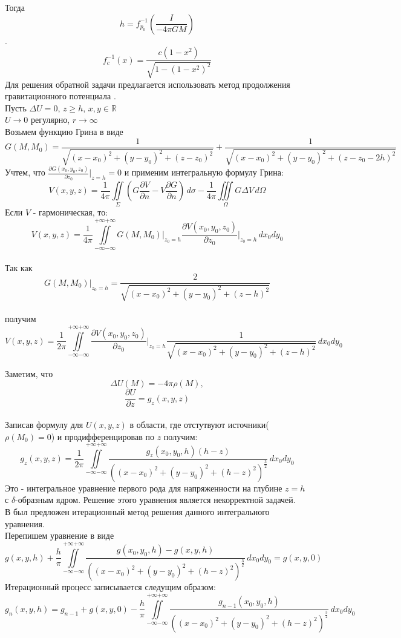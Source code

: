\documentclass[12pt]{article}
\begin{document}
Тогда \[h = f_{p_0}^{-1}\left({\frac{I}{-4{\pi}GM}} \right)\].
\[f_c^{-1}(x)={\frac{c(1-x^2)}{\sqrt{1-(1-x^2)^2}}}\]
\newline
Для решения обратной задачи предлагается использовать метод продолжения гравитационного потенциала \cite{dmitriev2012iterative1786867}.\\
\newline
Пусть ${\Delta}U=0$, $z{\geqslant}h$,
 $x,y {\in} \mathbb{ R}$\\
	$U{\longrightarrow}0$ регулярно, 
$r{\longrightarrow}{\infty}$\\
Возьмем функцию Грина в виде \[G(M,M_0)=\frac{1}{\sqrt{(x-x_0)^2+(y-y_0)^2+(z-z_0)^2}}+\frac{1}{\sqrt{(x-x_0)^2+(y-y_0)^2+(z-z_0-2h)^2}}\]
Учтем, что $\displaystyle\frac{{\partial}G(x_0,y_0,z_0)}{{\partial}z_0}{\Bigr|_{{z}=h}}=0$ и применим интегральную формулу Грина:\\
\[V(x,y,z)=\frac{1}{4\pi}\iint\limits_{\Sigma}\left({G\frac{{\partial}V}{{\partial}n} - V\frac{{\partial}G}{{\partial}n}}\right)\,d{\sigma} - \frac{1}{4\pi}\iiint\limits_{\Omega}G{\Delta}V\,d{\Omega}\]
Если $V$ - гармоническая, то:
\[V(x,y,z)=\frac{1}{4\pi}\iint\limits_{{-\infty}{-\infty}}^{{+\infty}{+\infty}}G(M,M_0){\Bigr|_{{z_0}=h}}\frac{{\partial}V(x_0,y_0,z_0)}{{\partial}z_0}{\Bigr|_{{z_0}=h}}\,dx_0dy_0\]\\

Так как $$G(M,M_0){\Bigr|_{{z_0}=h}}=\frac{2}{\sqrt{(x-x_0)^2+(y-y_0)^2+(z-h)^2}}$$ \\

получим \\
\[V(x,y,z)=\frac{1}{2\pi}\iint\limits_{{-\infty}{-\infty}}^{{+\infty}{+\infty}}\frac{{\partial}V(x_0,y_0,z_0)}{{\partial}z_0}{\Bigr|_{{z_0}=h}\frac{1}{\sqrt{(x-x_0)^2+(y-y_0)^2+(z-h)^2}}}\,dx_0dy_0\]

Заметим, что \[{\Delta}U(M)=-4{\pi}{\rho}(M),\] 
 \[\frac{{\partial}U}{{\partial}z}=g_z(x,y,z)\] \\
Записав формулу для $U(x,y,z)$ в области, где отстутвуют источники($\rho(M_0)=0$) и продифференцировав по $z$ получим:
\[g_z(x,y,z)=\frac{1}{2\pi}\iint\limits_{{-\infty}{-\infty}}^{{+\infty}{+\infty}}\frac{g_z(x_0,y_0,h)(h-z)}{((x-x_0)^2+(y-y_0)^2+(h-z)^2)^{\frac{3}{2}}} \,dx_0dy_0\]
Это - интегральное уравнение первого рода для напряженности на глубине $z=h$ с $\delta$-образным ядром. Решение этого уравнения является некорректной задачей.\\
В \cite{dmitriev2012iterative1786867} был предложен итерационный метод решения данного интегрального уравнения.\\
Перепишем уравнение в  виде \[g(x,y,h)+\frac{h}{\pi}\iint\limits_{{-\infty}{-\infty}}^{{+\infty}{+\infty}}\frac{g(x_0,y_0,h)-g(x,y,h)}{((x-x_0)^2+(y-y_0)^2+(h-z)^2)^{\frac{3}{2}}} \,dx_0dy_0=g(x,y,0)\]
Итерационный процесс записывается следущим образом:
\[g_n(x,y,h)=g_{n-1}+g(x,y,0)-\frac{h}{\pi}\iint\limits_{{-\infty}{-\infty}}^{{+\infty}{+\infty}}\frac{g_{n-1}(x_0,y_0,h)}{((x-x_0)^2+(y-y_0)^2+(h-z)^2)^{\frac{3}{2}}} \,dx_0dy_0\]
\end{document}
